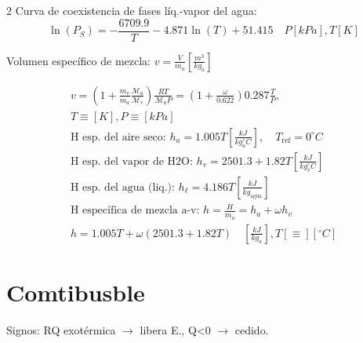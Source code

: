 \documentclass[9pt]{article}
\begin{document}
\begin{multicols}{2}
Curva de coexistencia de fases líq.-vapor del agua:
\begin{equation*}
  \ln({P_S}) = -\frac{6709.9}{T} - 4.871\ln({T})+51.415\quad P [kPa], T [K]
\end{equation*}






Volumen específico de mezcla: $\displaystyle v = \frac{V}{m_a} \left[\frac{m^3}{kg_a}\right]$

\begin{gather*}
  v = \left(1 + \frac{m_v}{m_a }\frac{\mathcal{M}_a}{\mathcal{M}_v}\right)\frac{RT}{\mathcal{M}_aP}= \left(1+ \frac{\omega}{0.622}\right)0.287 \frac{T}{P},\\
  T\equiv [K], P\equiv [kPa]\\
  \text{H esp. del aire seco: }h_a = 1.005 T \left[\frac{kJ}{kg_a^\circ C}\right], \quad T_\text{ref}= 0^\circ C\\
  \text{H esp. del vapor de H2O: }h_v = 2501.3 + 1.82T \left[\frac{kJ}{kg_v^\circ C}\right]\\
  \text{H esp. del agua (liq.): }h_\ell = 4.186 T \left[\frac{kJ}{kg_{\text{agua}}}\right]\\
  \text{H específica de mezcla a-v: } h = \frac{H}{m_a} = h_a + \omega h_v\\
  h = 1.005T + \omega (2501.3 + 1.82T) \quad \left[\frac{kJ}{kg_a}\right], T[\equiv] [^\circ C]
\end{gather*}

\section{Comtibusble}
 Signos: RQ exotérmica $\rightarrow$ libera E., Q<0 $\rightarrow$ cedido.


\end{multicols}
\end{document}
